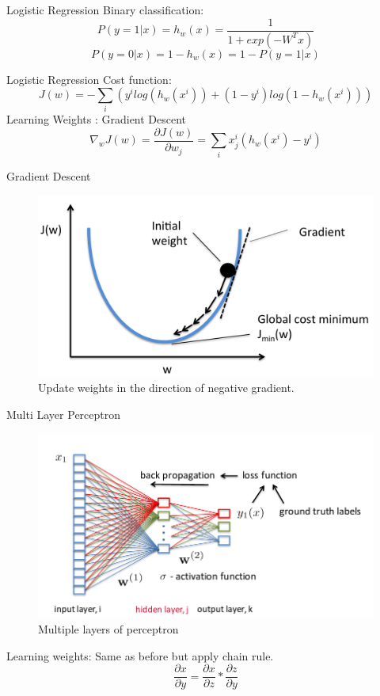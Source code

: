﻿\documentclass[aspectratio=43,mathserif,xcolor={usenames,dvipsnames,svgnames,table},10pt]{beamer}
\begin{document}
\begin{frame}{Logistic Regression}
Binary classification:
$$P(y = 1 | x) = h_w(x) = \frac{1}{1 + exp(-W^T x)}$$
$$P(y = 0 | x) = 1 - h_w(x) = 1 - P(y = 1 | x)$$
\end{frame}

\begin{frame}{Logistic Regression}
 Cost function: 
 $$ J(w) = - \sum_{i} ( y^i log(h_w(x^i)) + (1 - y^i) log(1 - h_w(x^i))  ) $$
 Learning Weights : Gradient Descent
 $$\nabla_w J(w) = \frac{\partial J(w)}{\partial w_j} = \sum_i x^i_j (h_w(x^i) - y^i) $$
\end{frame}

\begin{frame}{Gradient Descent}
\begin{figure}[h]
    \includegraphics[width=0.7\linewidth]{images/gd.png}  
    \caption{Update weights in the direction of negative gradient.}
  \end{figure}
\end{frame}

\begin{frame}{Multi Layer Perceptron}
\begin{figure}[h]
    \includegraphics[width=0.7\linewidth]{images/mlp.png}  
    \caption{Multiple layers of perceptron}
  \end{figure}
  Learning weights: Same as before but apply chain rule.
  $$ \frac{\partial x}{\partial y}  = \frac{\partial x}{\partial z} * \frac{\partial z}{\partial y} $$
\end{frame}
\end{document}
